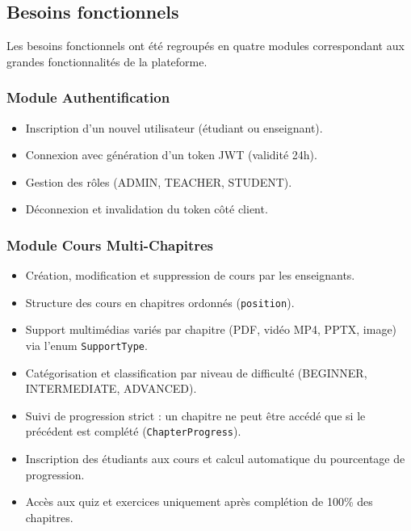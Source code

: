 \documentclass[12pt,a4paper]{report}
\begin{document}
\subsection{Besoins fonctionnels}

Les besoins fonctionnels ont été regroupés en quatre modules correspondant aux grandes fonctionnalités de la plateforme.

\subsubsection{Module Authentification}
\begin{itemize}[leftmargin=*]
  \item Inscription d'un nouvel utilisateur (étudiant ou enseignant).
  \item Connexion avec génération d'un token JWT (validité 24h).
  \item Gestion des rôles (ADMIN, TEACHER, STUDENT).
  \item Déconnexion et invalidation du token côté client.
\end{itemize}

\subsubsection{Module Cours Multi-Chapitres}
\begin{itemize}[leftmargin=*]
  \item Création, modification et suppression de cours par les enseignants.
  \item Structure des cours en chapitres ordonnés (\texttt{position}).
  \item Support multimédias variés par chapitre (PDF, vidéo MP4, PPTX, image) via l'enum \texttt{SupportType}.
  \item Catégorisation et classification par niveau de difficulté (BEGINNER, INTERMEDIATE, ADVANCED).
  \item Suivi de progression strict : un chapitre ne peut être accédé que si le précédent est complété (\texttt{ChapterProgress}).
  \item Inscription des étudiants aux cours et calcul automatique du pourcentage de progression.
  \item Accès aux quiz et exercices uniquement après complétion de 100\% des chapitres.
\end{itemize}
\end{document}
